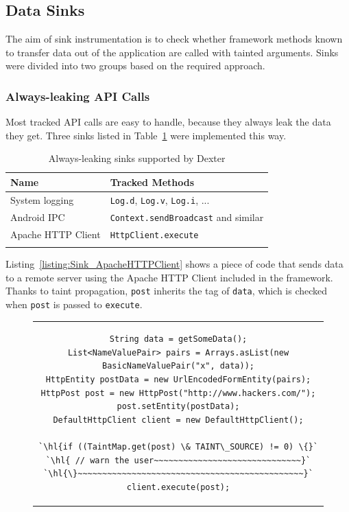 \documentclass[12pt,twoside,notitlepage]{report}
\begin{document}
\subsection{Data Sinks}

The aim of sink instrumentation is to check whether framework methods known to transfer data out of the application are called with tainted arguments. Sinks were divided into two groups based on the required approach.

\subsubsection{Always-leaking API Calls}

Most tracked API calls are easy to handle, because they always leak the data they get. Three sinks listed in Table~\ref{table:Sinks_AlwaysLeaking} were implemented this way.

\begin{table}[h]
	\begin{center}
	\begin{tabular}{|l|l|}
		\firsthline
		\textbf{Name}         & \textbf{Tracked Methods} \\
		\hline
		System logging        & \verb$Log.d$, \verb$Log.v$, \verb$Log.i$, ... \\
		Android IPC           & \verb$Context.sendBroadcast$ and similar \\
		Apache HTTP Client    & \verb$HttpClient.execute$ \\
		\lasthline
	\end{tabular}
	\end{center}
	\caption{Always-leaking sinks supported by Dexter}
	\label{table:Sinks_AlwaysLeaking}
\end{table}

Listing~\ref{listing:Sink_ApacheHTTPClient} shows a piece of code that sends data to a remote server using the Apache HTTP Client included in the framework. Thanks to taint propagation, \verb$post$ inherits the tag of \verb$data$, which is checked when \verb$post$ is passed to \verb$execute$.

\begin{figure}[h]
	\centering
	\begin{tabular}{c}
	\begin{lstlisting}
String data = getSomeData();
List<NameValuePair> pairs = Arrays.asList(new BasicNameValuePair("x", data));
HttpEntity postData = new UrlEncodedFormEntity(pairs);
HttpPost post = new HttpPost("http://www.hackers.com/");
post.setEntity(postData);
DefaultHttpClient client = new DefaultHttpClient();

`\hl{if ((TaintMap.get(post) \& TAINT\_SOURCE) != 0) \{}`
`\hl{ // warn the user~~~~~~~~~~~~~~~~~~~~~~~~~~~~~~}`
`\hl{\}~~~~~~~~~~~~~~~~~~~~~~~~~~~~~~~~~~~~~~~~~~~~~~}`
client.execute(post);
	\end{lstlisting}
	\end{tabular}
	\begin{lstlisting}[caption={HTTP request using the Apache client, with sink instrumentation},
	                   label={listing:Sink_ApacheHTTPClient}]
	\end{lstlisting}
\end{figure}
\end{document}
